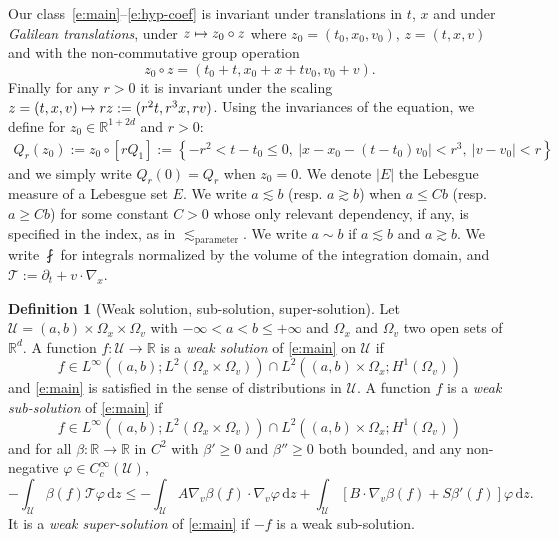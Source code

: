 \documentclass[JEP,XML,SOM,Unicode,NoFloatCountersInSection,published]{cedram}
\let\mathcal\mathscr
\def\mto{\mathchoice{\longmapsto}{\mapsto}{\mapsto}{\mapsto}}
\theoremstyle{definition}
\newtheorem{definition}[theorem]{Definition}
\theoremstyle{remark}
\newcommand\R{{\mathbb R}}
\newcommand{\cU}{\mathcal{U}}
\newcommand{\cT}{\mathcal T}
\newcommand{\dd}{{\, \mathrm d}}
\begin{document}
Our class~\eqref{e:main}--\eqref{e:hyp-coef} is invariant under
translations in $t$, $x$ and under \emph{Galilean translations},
\ie under $z \mto z_0 \circ z$ where $z_0 =(t_0,x_0,v_0)$,
$z = (t,x,v)$ and with the non-commutative group operation
\begin{equation*}
z_0 \circ z = (t_0+t,x_0+x + t v_0, v_0 + v).
\end{equation*}
Finally for any $r>0$ it is invariant under the scaling
$z=(t,x,v) \mto rz := (r^2t,r^3x,r v)$. Using the invariances of
the equation, we define for $z_0 \in \R^{1+2d}$ and $r>0$:
\begin{align*}
Q_r(z_0) := z_0 \circ \left[ r Q_1 \right]
:= \left\{ -r^2 <t-t_0 \le 0, \ |x - x_0- (t-t_0)v_0|
< r^3, \ |v-v_0| < r \right\}
\end{align*}
and we simply write $Q_r(0)=Q_r$ when $z_0=0$. We denote $|E|$
the Lebesgue measure of a Lebesgue set $E$. We write
$a \lesssim b$ (resp. $a \gtrsim b$) when $a \le Cb$ (resp.
$a \ge Cb$) for some constant $C>0$ whose only relevant
dependency, if any, is specified in the index, as in
$\lesssim_{\text{parameter}}$. We write $a\sim b$ if
$a \lesssim b$ and $a \gtrsim b$. We write $\fint$ for integrals
normalized by the volume of the integration domain, and
$\cT:=\partial_t+v\cdot \nabla_x$.

\skpt
\begin{definition}[Weak solution, sub-solution, super-solution]
\label{d:weak}
Let $\cU = (a,b) \times \Omega_x \times \Omega_v$ with
$-\infty<a < b \le +\infty$ and $\Omega_x$ and $\Omega_v$ two
open sets of $\R^d$. A function $f: \cU \to \R$ is a \emph{weak
solution} of \eqref{e:main} on $\cU$ if
\[
f \in L^\infty ((a,b);L^2 (\Omega_x \times \Omega_v)) \cap L^2
((a,b) \times \Omega_x;H^1(\Omega_v))
\]
and \eqref{e:main} is
satisfied in the sense of distributions in $\cU$. A function
$f$ is a \emph{weak sub-solution} of \eqref{e:main} if
\[
f \in L^\infty ((a,b);L^2 (\Omega_x \times \Omega_v)) \cap L^2
((a,b) \times \Omega_x;H^1(\Omega_v))
\]
and for all
$\beta : \R \to \R$ in $C^2$ with $\beta' \ge 0$ and
$\beta'' \ge 0$ both bounded, and any non-negative
$\varphi \in C^\infty_c (\cU)$,
\begin{equation*}
- \int_\cU \beta(f) \cT \varphi \dd z
\le - \int_{\cU} A \nabla_v \beta(f) \cdot \nabla_v \varphi \dd
z + \int_{\cU} \left[ B \cdot \nabla_v \beta(f)+S \beta'(f)
\right] \varphi \dd z.
\end{equation*}
It is a \emph{weak super-solution} of \eqref{e:main} if $-f$ is
a weak sub-solution.
\end{definition}
\end{document}
